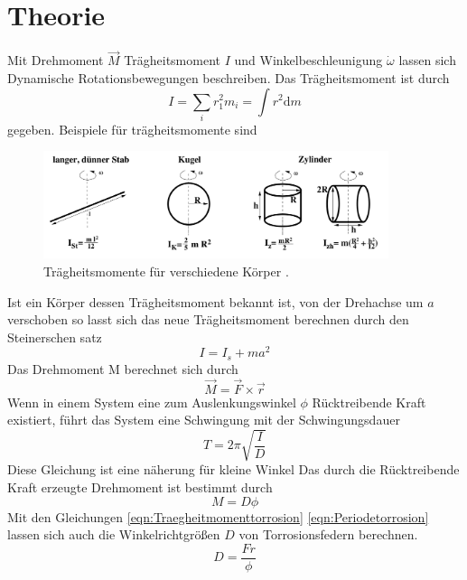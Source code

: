 

\section{Theorie}
\label{sec:Theorie}
Mit Drehmoment $\vec{M}$ Trägheitsmoment $I$ und Winkelbeschleunigung $\dot{\omega}$
lassen sich Dynamische Rotationsbewegungen beschreiben. Das Trägheitsmoment ist
durch
\begin{equation}
  I=\sum_i r_1^2m_i=\int r^2 \text{d}m
\end{equation}
gegeben.
Beispiele für trägheitsmomente sind
\begin{figure}
  \centering
  \includegraphics[width=0.9\textwidth]{Traegheitsmomente.png}
  \caption{Trägheitsmomente für verschiedene Körper \cite{sample}.}
  \label{fig:Traegheitsmomente}
\end{figure}
Ist ein Körper dessen Trägheitsmoment bekannt ist, von der Drehachse um
$a$ verschoben so lasst sich das neue Trägheitsmoment berechnen durch den
Steinerschen satz
\begin{equation}
  I=I_s+m a^2
\end{equation}
Das Drehmoment M berechnet sich durch
\begin{equation}
  \vec{M}=\vec{F}\times\vec{r}
\end{equation}
Wenn in einem System eine zum Auslenkungswinkel $\phi$ Rücktreibende Kraft
existiert, führt das System eine Schwingung mit der Schwingungsdauer
\begin{equation}
  T=2\pi\sqrt{\frac{I}{D}}
  \label{eqn:Periodetorrosion}
\end{equation}
Diese Gleichung ist eine näherung für kleine Winkel
Das durch die Rücktreibende Kraft erzeugte Drehmoment ist bestimmt durch
\begin{equation}
  M=D \phi
  \label{eqn:Traegheitmomenttorrosion}
\end{equation}
Mit den Gleichungen \eqref{eqn:Traegheitmomenttorrosion} \eqref{eqn:Periodetorrosion}
lassen sich auch die Winkelrichtgrößen $D$ von Torrosionsfedern
berechnen.
\begin{equation}
  D=\frac{Fr}{\phi}
  \label{eqn:Winkelrichtgroesse}
\end{equation}
  \cite{sample}
